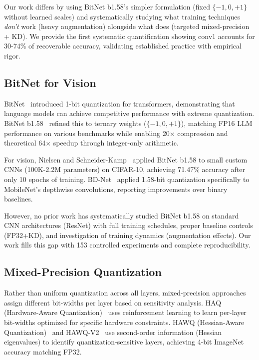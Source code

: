 Our work differs by using BitNet b1.58's simpler formulation (fixed $\{-1,0,+1\}$ without learned scales) and systematically studying what training techniques \textit{don't} work (heavy augmentation) alongside what does (targeted mixed-precision + KD). We provide the first systematic quantification showing conv1 accounts for 30-74\% of recoverable accuracy, validating established practice with empirical rigor.

\subsection{BitNet for Vision}

BitNet~\cite{wang2023bitnet} introduced 1-bit quantization for transformers, demonstrating that language models can achieve competitive performance with extreme quantization. BitNet b1.58~\cite{ma2024bitnetb158} refined this to ternary weights ($\{-1,0,+1\}$), matching FP16 LLM performance on various benchmarks while enabling 20× compression and theoretical 64× speedup through integer-only arithmetic.

For vision, Nielsen and Schneider-Kamp~\cite{nielsen2024bitnetreloaded} applied BitNet b1.58 to small custom CNNs (100K-2.2M parameters) on CIFAR-10, achieving 71.47\% accuracy after only 10 epochs of training. BD-Net~\cite{kim2025bdnet} applied 1.58-bit quantization specifically to MobileNet's depthwise convolutions, reporting improvements over binary baselines.

However, no prior work has systematically studied BitNet b1.58 on standard CNN architectures (ResNet) with full training schedules, proper baseline controls (FP32+KD), and investigation of training dynamics (augmentation effects). Our work fills this gap with 153 controlled experiments and complete reproducibility.

\subsection{Mixed-Precision Quantization}

Rather than uniform quantization across all layers, mixed-precision approaches assign different bit-widths per layer based on sensitivity analysis. HAQ (Hardware-Aware Quantization)~\cite{wang2019haq} uses reinforcement learning to learn per-layer bit-widths optimized for specific hardware constraints. HAWQ (Hessian-Aware Quantization)~\cite{dong2019hawq} and HAWQ-V2~\cite{dong2020hawqv2} use second-order information (Hessian eigenvalues) to identify quantization-sensitive layers, achieving 4-bit ImageNet accuracy matching FP32.

